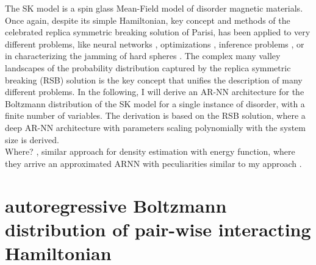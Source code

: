 \documentclass[aps,physrev,10pt,floatfix,reprint]{revtex4-2}
\begin{document}
The SK model \cite{PhysRevLett.35.1792} is a spin glass Mean-Field model of disorder magnetic materials. Once again, despite its simple Hamiltonian, key concept and methods of the celebrated \cite{Nobel2021} replica symmetric breaking solution \cite{PARISI1979203, PhysRevLett.43.1754} of Parisi, has been applied to very different problems, like neural networks \cite{Gardner_1987, PhysRevLett.55.1530}, optimizations \cite{doi:10.1126/science.1073287}, inference problems \cite{doi:10.1080/00018732.2016.1211393}, or in characterizing the jamming of hard spheres \cite{RevModPhys.82.789, PhysRevLett.102.195701}. The complex many valley landscapes of the probability distribution captured by the replica symmetric breaking (RSB) solution is the key concept that unifies the description of many different problems. In the following, I will derive an AR-NN architecture for the Boltzmann distribution of the SK model for a single instance of disorder, with a finite number of variables. The derivation is based on the RSB solution, where a deep AR-NN architecture with parameters scaling polynomially with the system size is derived. \\
Where?
\cite{Carleo2018},
similar approach for density estimation with energy function, where they arrive an approximated ARNN with peculiarities similar to my approach \cite{pmlr-v80-huang18d}.
            
\section{autoregressive Boltzmann distribution of pair-wise interacting Hamiltonian}
\end{document}

